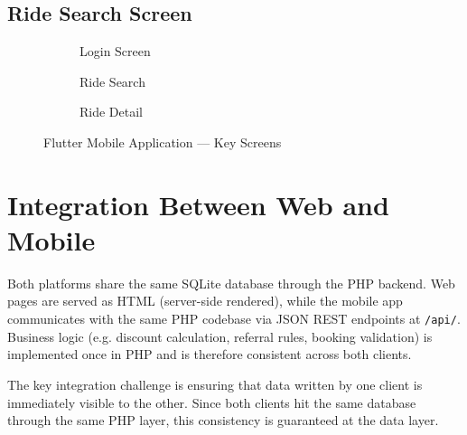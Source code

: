 \documentclass[12pt,a4paper,openright]{report}
\begin{document}
\subsection{Ride Search Screen}

\begin{figure}[H]
\centering
\begin{subfigure}[b]{0.32\textwidth}
\centering
{}
\caption{Login Screen}
\end{subfigure}
\hfill
\begin{subfigure}[b]{0.32\textwidth}
\centering
{}
\caption{Ride Search}
\end{subfigure}
\hfill
\begin{subfigure}[b]{0.32\textwidth}
\centering
{}
\caption{Ride Detail}
\end{subfigure}
\caption{Flutter Mobile Application — Key Screens}
\label{fig:mobile-screens}
\end{figure}

\section{Integration Between Web and Mobile}

Both platforms share the same SQLite database through the PHP backend. Web pages are served as HTML (server-side rendered), while the mobile app communicates with the same PHP codebase via JSON REST endpoints at \texttt{/api/}. Business logic (e.g. discount calculation, referral rules, booking validation) is implemented once in PHP and is therefore consistent across both clients.

The key integration challenge is ensuring that data written by one client is immediately visible to the other. Since both clients hit the same database through the same PHP layer, this consistency is guaranteed at the data layer.
\end{document}
